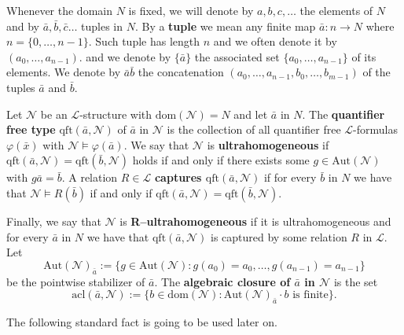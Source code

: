 \documentclass[11pt]{amsart}
\theoremstyle{plain}
\theoremstyle{definition}
\begin{document}
Whenever the domain $N$ is fixed, we will denote by $a,b,c,\ldots$ the elements of $N$ and by $\bar{a},\bar{b}, \bar{c}\ldots$ tuples in $N$. By a {\bf tuple} we mean any finite map $\bar{a} \colon n\to N$ where  $n=\{0,\ldots,n-1\}$.  Such tuple has length $n$ and we often denote it by $(a_0,\ldots,a_{n-1})$. and we
denote by $\{\bar{a}\}$ the associated set $\{a_0,\ldots,a_{n-1}\}$ of its elements. We denote by  $\bar{a}\bar{b}$ the concatenation $(a_0,\ldots,a_{n-1},b_0,\ldots,b_{m-1})$ of the tuples $\bar{a}$ and $\bar{b}$.


Let  $\mathcal{N}$ be an $\mathcal{L}$-structure with $\mathrm{dom}(\mathcal{N})=N$ and let $\bar{a}$  in $N$. The {\bf quantifier free type} $\mathrm{qft}(\bar{a},\mathcal{N})$ of $\bar{a}$ in $\mathcal{N}$ is the collection of all quantifier free $\mathcal{L}$-formulas $\varphi(\bar{x})$ with $\mathcal{N}\models \varphi(\bar{a})$. 
We say that $\mathcal{N}$ is {\bf ultrahomogeneous} if $\mathrm{qft}(\bar{a},\mathcal{N})= \mathrm{qft}(\bar{b},\mathcal{N})$ holds if and only if there exists some $g\in \mathrm{Aut}(\mathcal{N})$ with $g\bar{a}=\bar{b}$.
A relation $R\in \mathcal{L}$ {\bf captures $\mathrm{qft}(\bar{a},\mathcal{N})$}  if  for every $\bar{b}$ in $N$ we have that $\mathcal{N}\models R(\bar{b})$ if and only if $\mathrm{qft}(\bar{a},\mathcal{N})= \mathrm{qft}(\bar{b},\mathcal{N})$.

Finally,  we say that  $\mathcal{N}$ is {\bf R--ultrahomogeneous} if it is ultrahomogeneous and for every $\bar{a}$ in $N$ we have that $\mathrm{qft}(\bar{a},\mathcal{N})$ is captured by some relation $R$ in $\mathcal{L}$. Let
 \[\mathrm{Aut}(\mathcal{N})_{\bar{a}}:=\{g\in \mathrm{Aut}(\mathcal{N}) \colon g(a_0)=a_0, \ldots, g(a_{n-1})=a_{n-1} \}\]
 be the pointwise stabilizer of $\bar{a}$. 
The {\bf algebraic closure of $\bar{a}$ in $\mathcal{N}$} is the set
\[\mathrm{acl}(\bar{a},\mathcal{N}):=\{ b \in \mathrm{dom}(\mathcal{N}) \colon \mathrm{Aut}(\mathcal{N})_{\bar{a}}\cdot b \text{ is finite} \}.\]


The following standard fact is going to be used later on.
\end{document}
